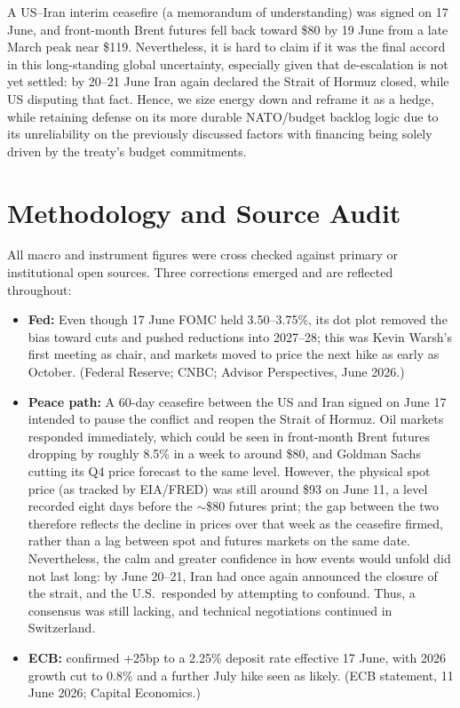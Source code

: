 \documentclass[11pt,a4paper]{article}
\begin{document}
A US--Iran interim ceasefire (a memorandum of understanding) was signed on 17 June, and front-month Brent futures fell back toward \$80 by 19 June from a late March peak near \$119. Nevertheless, it is hard to claim if it was the final accord in this long-standing global uncertainty, especially given that de-escalation is not yet settled: by 20--21 June Iran again declared the Strait of Hormuz closed, while US disputing that fact. Hence, we size energy down and reframe it as a hedge, while retaining defense on its more durable NATO/budget backlog logic due to its unreliability on the previously discussed factors with financing being solely driven by the treaty's budget commitments.

\section{Methodology and Source Audit}

All macro and instrument figures were cross checked against primary or institutional open sources. Three corrections emerged and are reflected throughout:

\begin{itemize}
\item \textbf{Fed:} Even though 17 June FOMC held 3.50--3.75\%, its dot plot removed the bias toward cuts and pushed reductions into 2027--28; this was Kevin Warsh's first meeting as chair, and markets moved to price the next hike as early as October. (Federal Reserve; CNBC; Advisor Perspectives, June 2026.)
\item \textbf{Peace path:} A 60-day ceasefire between the US and Iran signed on June 17 intended to pause the conflict and reopen the Strait of Hormuz. Oil markets responded immediately, which could be seen in front-month Brent futures dropping by roughly 8.5\% in a week to around \$80, and Goldman Sachs cutting its Q4 price forecast to the same level. However, the physical spot price (as tracked by EIA/FRED) was still around \$93 on June 11, a level recorded eight days before the \(\sim\)\$80 futures print; the gap between the two therefore reflects the decline in prices over that week as the ceasefire firmed, rather than a lag between spot and futures markets on the same date. Nevertheless, the calm and greater confidence in how events would unfold did not last long: by June 20--21, Iran had once again announced the closure of the strait, and the U.S.\ responded by attempting to confound. Thus, a consensus was still lacking, and technical negotiations continued in Switzerland.
\item \textbf{ECB:} confirmed +25bp to a 2.25\% deposit rate effective 17 June, with 2026 growth cut to 0.8\% and a further July hike seen as likely. (ECB statement, 11 June 2026; Capital Economics.)
\end{itemize}
\end{document}
